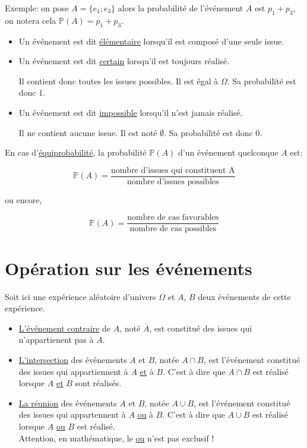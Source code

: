 \documentclass[french]{book}
\begin{document}
Exemple: on pose $A=\{ e_1 ; e_3 \}$  alors la probabilité de l'événement $A$ est $p_1+p_3$, on notera cela $\mathbb{P}(A)=p_1+p_3$.

\begin{defn}
\begin{itemize}


\item Un événement est dit \underline{élémentaire} lorsqu'il est composé d'une seule issue.
\item Un événement est dit \underline{certain} lorsqu'il est toujours réalisé. 

Il contient donc toutes les issues possibles. Il est égal à $\Omega$. Sa probabilité est donc 1.
\item Un événement est dit \underline{impossible} lorsqu'il n'est jamais réalisé. 

Il ne contient aucune issue. Il est noté $\emptyset$.  Sa probabilité est donc 0.

\end{itemize}
\end{defn}

\begin{prop}
En cas d'\underline{équiprobabilité}, la probabilité $\mathbb{P}(A)$ d'un événement quelconque $A$ est: 

$$\mathbb{P}(A)=\frac{\text{nombre d'issues qui constituent A}}{\text{nombre d'issues possibles}}$$

ou encore,

$$\mathbb{P}(A)=\frac{\text{nombre de cas favorables}}{\text{nombre de cas possibles}}$$
\end{prop}

\section{Opération sur les événements}
Soit ici une expérience aléatoire d'univers $\Omega$ et $A$, $B$ deux événements de cette expérience.

\begin{defn}
\begin{itemize}
\item \underline{L'événement contraire} de $A$, noté $\overline{A}$, est constitué des issues qui n'appartienent pas à $A$.
\item \underline{L'intersection} des événements $A$ et $B$, notée $A \cap B$, est l'événement constitué des issues qui appartiennent à $A$ \underline{et} à $B$. C'est à dire que $A \cap B$ est réalisé lorsque $A$ \underline{et} $B$ sont réalisés.
\item \underline{La réunion} des événements $A$ et $B$, notée $A \cup B$, est l'événement constitué des issues qui appartennent à $A$ \underline{ou} à $B$. C'est à dire que $A \cup B$ est réalisé lorsque $A$ \underline{ou} $B$ est réalisé.\\

Attention, en mathématique, le \underline{ou} n'est pas exclusif !

\end{itemize}
\end{defn}
\end{document}
